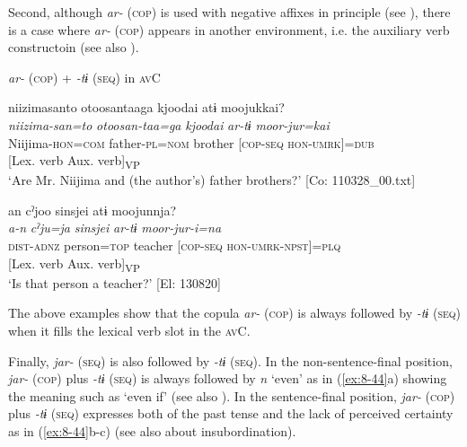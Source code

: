   Second, although \textit{ar-} (\textsc{cop}) is used with negative affixes in principle (see ), there is a case where \textit{ar-} (\textsc{cop}) appears in another environment, i.e. the auxiliary verb constructoin (see also ).

\ea\label{ex:8-43}
  \textit{ar-} (\textsc{cop}) + \textit{-tɨ} (\textsc{seq}) in \textsc{av}C

\ea
{\US}
\gllll   {\textbar}niizimasanto  otoosan{\textbar}taaga  {\textbar}kjoodai{\textbar}  atɨ  moojukkai?\\
\textit{niizima-san=to}  \textit{otoosan-taa=ga}  \textit{kjoodai}  \textit{ar-tɨ}  \textit{moor-jur=kai}\\
Niijima-\textsc{hon}=\textsc{com}  father-\textsc{pl}=\textsc{nom}  brother  [\textsc{cop}-\textsc{seq}  \textsc{hon}-\textsc{umrk}]=\textsc{dub}\\
            {}[Lex. verb  Aux. verb]\textsubscript{VP}\\
\glt ‘Are Mr. Niijima and (the author’s) father brothers?’ [Co: 110328\_00.txt]

\ex
{\TM}
\gllll  an  cˀjoo  sinsjei  atɨ  moojunnja?\\
\textit{a-n}  \textit{cˀju=ja}  \textit{sinsjei}  \textit{ar-tɨ}  \textit{moor-jur-i=na}\\
\textsc{dist}-\textsc{adnz}  person=\textsc{top}  teacher  [\textsc{cop}-\textsc{seq}  \textsc{hon}-\textsc{umrk}-\textsc{npst}]=\textsc{plq}\\
            {}[Lex. verb  Aux. verb]\textsubscript{VP}\\
\glt ‘Is that person a teacher?’ [El: 130820]

\z
\z

The above examples show that the copula \textit{ar-} (\textsc{cop}) is always followed by \textit{-tɨ} (\textsc{seq}) when it fills the lexical verb slot in the \textsc{av}C.

  Finally, \textit{jar-} (\textsc{seq}) is also followed by \textit{-tɨ} (\textsc{seq}). In the non-sentence-final position, \textit{jar-} (\textsc{cop}) plus \textit{-tɨ} (\textsc{seq}) is always followed by \textit{n} ‘even’ as in (\ref{ex:8-44}a) showing the meaning such as ‘even if’ (see also ). In the sentence-final position, \textit{jar-} (\textsc{cop}) plus \textit{-tɨ} (\textsc{seq}) expresses both of the past tense and the lack of perceived certainty as in (\ref{ex:8-44}b-c) (see also  about insubordination).

